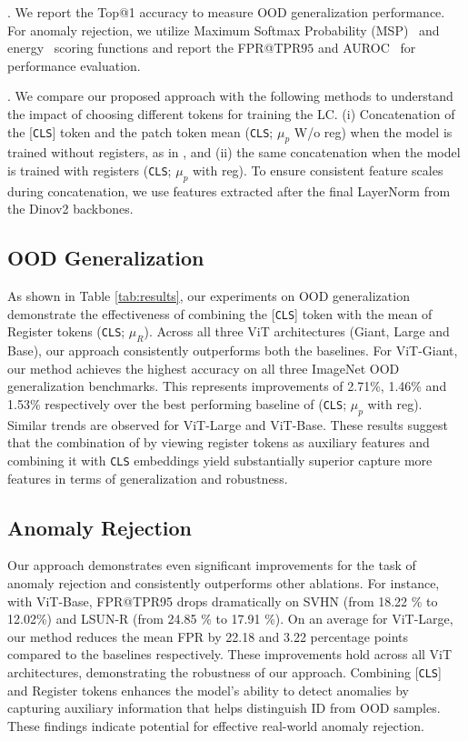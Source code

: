 . We report the Top@1 accuracy to measure OOD generalization performance. For anomaly rejection, we utilize Maximum Softmax Probability (MSP)~\cite{hendrycks2017a} and energy~\cite{energyood} scoring functions and report the FPR@TPR$95$ and AUROC~\cite{energyood} for performance evaluation.  

. We compare our proposed approach with the following methods to understand the impact of choosing different tokens for training the LC. (i) Concatenation of the [\texttt{CLS}] token and the patch token mean (\texttt{CLS}; $\mu_p$ W/o reg) when the model is trained without registers, as in \cite{oquab2023dinov2}, and (ii) the same concatenation when the model is trained with registers (\texttt{CLS}; $\mu_p$ with reg). To ensure consistent feature scales during concatenation, we use features extracted after the final LayerNorm from the Dinov2 backbones.

\subsection{OOD Generalization}
As shown in Table \ref{tab:results}, our experiments on OOD generalization demonstrate the effectiveness of combining the [\texttt{CLS}] token with the mean of Register tokens (\texttt{CLS}; $\mu_R$). Across all three ViT architectures (Giant, Large and Base), our approach consistently outperforms both the baselines. For ViT-Giant, our method achieves the highest accuracy on all three ImageNet OOD generalization benchmarks. This represents improvements of 2.71\%, 1.46\% and 1.53\% respectively over the best performing baseline of (\texttt{CLS}; $\mu_p$ with reg). Similar trends are observed for ViT-Large and ViT-Base. These results suggest that the combination of by viewing register tokens as auxiliary features and combining it with \texttt{CLS} embeddings yield substantially superior capture more features in terms of generalization and robustness. 
\subsection{Anomaly Rejection}
Our approach demonstrates even significant improvements for the task of anomaly rejection and consistently outperforms other ablations. For instance, with ViT-Base, FPR@TPR95 drops dramatically on SVHN (from 18.22 \% to 12.02\%) and LSUN-R (from 24.85 \% to 17.91 \%). On an average for ViT-Large, our method reduces the mean FPR by 22.18 and 3.22  percentage points compared to the baselines respectively. These improvements hold across all ViT architectures, demonstrating the robustness of our approach. Combining [\texttt{CLS}] and Register tokens enhances the model's ability to detect anomalies by capturing auxiliary information that helps distinguish ID from OOD samples. These findings indicate potential for effective real-world anomaly rejection.

